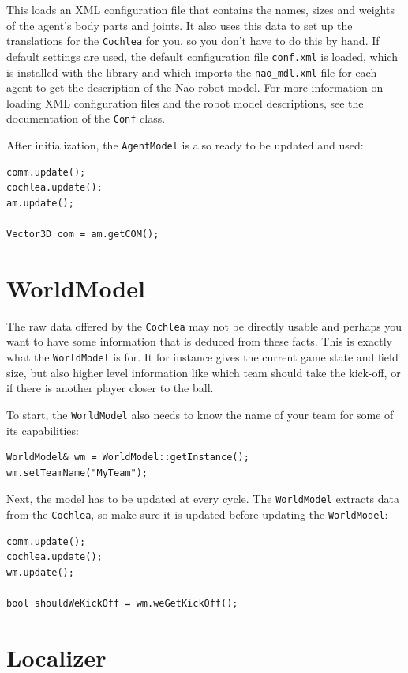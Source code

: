 This loads an XML configuration file that contains the names, sizes
and weights of the agent's body parts and joints. It also uses this
data to set up the translations for the {\tt Cochlea} for you, so you
don't have to do this by hand. If default settings are used, the
default configuration file {\tt conf.xml} is loaded, which is
installed with the library and which imports the {\tt nao\_mdl.xml}
file for each agent to get the description of the Nao robot model. For
more information on loading XML configuration files and the robot
model descriptions, see the documentation of the {\tt Conf} class.

After initialization, the {\tt AgentModel} is also ready to be updated
and used:
\begin{lstlisting}[frame=single]
comm.update();
cochlea.update();
am.update();

Vector3D com = am.getCOM();
\end{lstlisting}

\section{WorldModel}
\label{secWorldModel}

The raw data offered by the {\tt Cochlea} may not be directly usable
and perhaps you want to have some information that is deduced from
these facts. This is exactly what the {\tt WorldModel} is for. It for
instance gives the current game state and field size, but also higher
level information like which team should take the kick-off, or if
there is another player closer to the ball.

To start, the {\tt WorldModel} also needs to know the name of your
team for some of its capabilities:
\begin{lstlisting}[frame=single]
WorldModel& wm = WorldModel::getInstance();
wm.setTeamName("MyTeam");
\end{lstlisting}

Next, the model has to be updated at every cycle. The {\tt WorldModel}
extracts data from the {\tt Cochlea}, so make sure it is updated
before updating the {\tt WorldModel}:
\begin{lstlisting}[frame=single]
comm.update();
cochlea.update();
wm.update();

bool shouldWeKickOff = wm.weGetKickOff();
\end{lstlisting}

\section{Localizer}
\label{secLocalizer}


